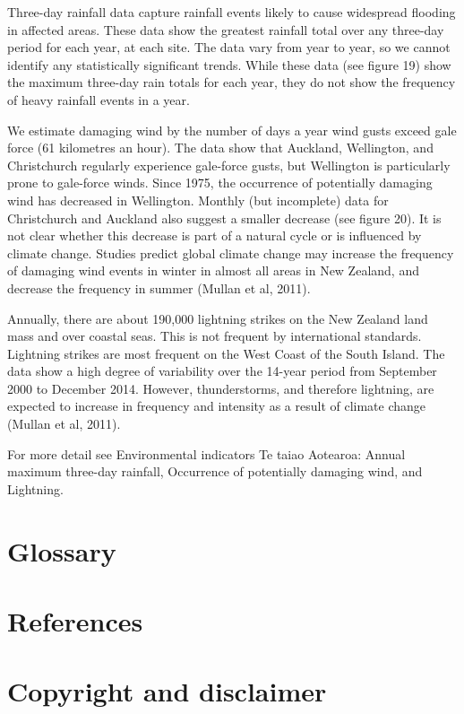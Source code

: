 \documentclass[11pt]{article} %
\begin{document}
Three-day rainfall data capture rainfall events likely to cause widespread flooding in affected areas. These data show the greatest rainfall total over any three-day period for each year, at each site. The data vary from year to year, so we cannot identify any statistically significant trends. While these data (see figure 19) show the maximum three-day rain totals for each year, they do not show the frequency of heavy rainfall events in a year.


We estimate damaging wind by the number of days a year wind gusts exceed gale force (61 kilometres an hour). The data show that Auckland, Wellington, and Christchurch regularly experience gale-force gusts, but Wellington is particularly prone to gale-force winds. Since 1975, the occurrence of potentially damaging wind has decreased in Wellington. Monthly (but incomplete) data for Christchurch and Auckland also suggest a smaller decrease (see figure 20). It is not clear whether this decrease is part of a natural cycle or is influenced by climate change. Studies predict global climate change may increase the frequency of damaging wind events in winter in almost all areas in New Zealand, and decrease the frequency in summer (Mullan et al, 2011).


Annually, there are about 190,000 lightning strikes on the New Zealand land mass and over coastal seas. This is not frequent by international standards. Lightning strikes are most frequent on the West Coast of the South Island. The data show a high degree of variability over the 14-year period from September 2000 to December 2014. However, thunderstorms, and therefore lightning, are expected to increase in frequency and intensity as a result of climate change (Mullan et al, 2011).

For more detail see Environmental indicators Te taiao Aotearoa: Annual maximum three-day rainfall, Occurrence of potentially damaging wind, and Lightning.

\section{Glossary}

\section{References}

\section{Copyright and disclaimer}
\end{document}
